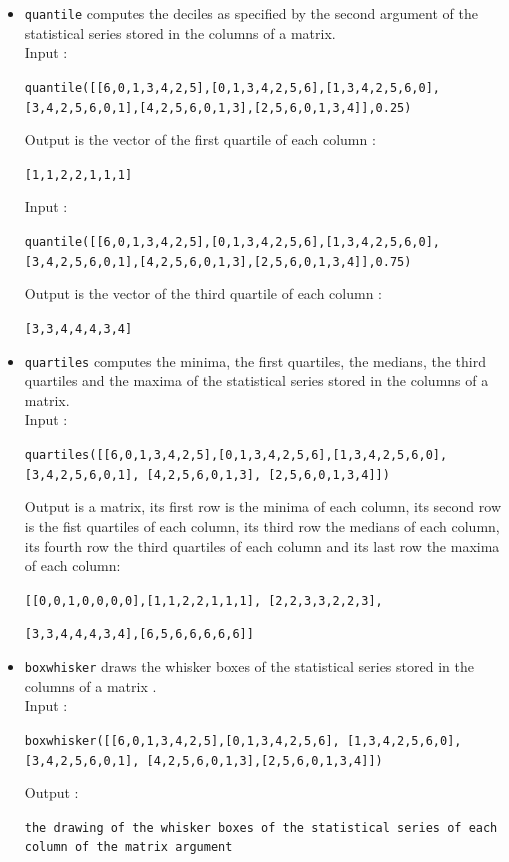 \documentclass[a4paper,11pt]{book}
\begin{document}
\begin{itemize}
\item{\tt quantile} computes the deciles as specified by the second
argument of the statistical series stored in the columns of a matrix.\\ 
Input :\begin{center}{\tt quantile([[6,0,1,3,4,2,5],[0,1,3,4,2,5,6],[1,3,4,2,5,6,0], [3,4,2,5,6,0,1],[4,2,5,6,0,1,3],[2,5,6,0,1,3,4]],0.25)}\end{center}
Output is the vector of the first quartile of each column  :
\begin{center}{\tt [1,1,2,2,1,1,1]}\end{center}
Input :
\begin{center}{\tt quantile([[6,0,1,3,4,2,5],[0,1,3,4,2,5,6],[1,3,4,2,5,6,0], [3,4,2,5,6,0,1],[4,2,5,6,0,1,3],[2,5,6,0,1,3,4]],0.75)}\end{center}
Output is the vector of the third quartile of each column  :
\begin{center}{\tt [3,3,4,4,4,3,4]}\end{center}

\item{\tt quartiles} computes the minima, the first quartiles, the 
medians, the third quartiles and the maxima of the statistical series
stored in the columns of a matrix.\\ 
Input :
\begin{center}{\tt quartiles([[6,0,1,3,4,2,5],[0,1,3,4,2,5,6],[1,3,4,2,5,6,0], [3,4,2,5,6,0,1], [4,2,5,6,0,1,3], [2,5,6,0,1,3,4]])}\end{center}
Output is a matrix, its first row is the minima of each column,
its second row is the fist quartiles of each column, 
its third row the medians 
of each column, its fourth row the third
quartiles of each column and its last row the maxima of each column:
\begin{center}{\tt [[0,0,1,0,0,0,0],[1,1,2,2,1,1,1], [2,2,3,3,2,2,3],}\end{center}
\begin{center}{\tt [3,3,4,4,4,3,4],[6,5,6,6,6,6,6]]}\end{center}

\item{\tt boxwhisker} draws the whisker boxes of the statistical series
stored in the columns of a matrix .\\
Input :
\begin{center}{\tt boxwhisker([[6,0,1,3,4,2,5],[0,1,3,4,2,5,6], [1,3,4,2,5,6,0],[3,4,2,5,6,0,1], [4,2,5,6,0,1,3],[2,5,6,0,1,3,4]])}\end{center}
Output :
\begin{center}{\tt the drawing of the whisker boxes of the statistical 
series of each column of the matrix argument}\end{center} 
\end{itemize}
\end{document}
